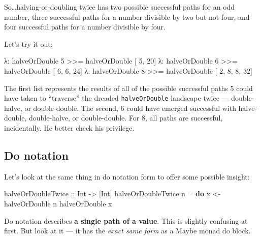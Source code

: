\documentclass[]{article}
\newenvironment{Shaded}{}{}
\newcommand{\KeywordTok}[1]{\textcolor[rgb]{0.00,0.44,0.13}{\textbf{{#1}}}}
\newcommand{\DataTypeTok}[1]{\textcolor[rgb]{0.56,0.13,0.00}{{#1}}}
\newcommand{\DecValTok}[1]{\textcolor[rgb]{0.25,0.63,0.44}{{#1}}}
\newcommand{\OtherTok}[1]{\textcolor[rgb]{0.00,0.44,0.13}{{#1}}}
\newcommand{\FunctionTok}[1]{\textcolor[rgb]{0.02,0.16,0.49}{{#1}}}
\newcommand{\NormalTok}[1]{{#1}}
\begin{document}
So\ldots{}halving-or-doubling twice has two possible successful paths
for an odd number, three successful paths for a number divisible by two
but not four, and four successful paths for a number divisible by four.

Let's try it out:

\begin{Shaded}
\begin{Highlighting}[]
\NormalTok{λ}\FunctionTok{:} \NormalTok{halveOrDouble }\DecValTok{5} \FunctionTok{>>=} \NormalTok{halveOrDouble}
\NormalTok{[       }\DecValTok{5}\NormalTok{, }\DecValTok{20}\NormalTok{]}
\NormalTok{λ}\FunctionTok{:} \NormalTok{halveOrDouble }\DecValTok{6} \FunctionTok{>>=} \NormalTok{halveOrDouble}
\NormalTok{[    }\DecValTok{6}\NormalTok{, }\DecValTok{6}\NormalTok{, }\DecValTok{24}\NormalTok{]}
\NormalTok{λ}\FunctionTok{:} \NormalTok{halveOrDouble }\DecValTok{8} \FunctionTok{>>=} \NormalTok{halveOrDouble}
\NormalTok{[ }\DecValTok{2}\NormalTok{, }\DecValTok{8}\NormalTok{, }\DecValTok{8}\NormalTok{, }\DecValTok{32}\NormalTok{]}
\end{Highlighting}
\end{Shaded}

The first list represents the results of all of the possible successful
paths 5 could have taken to ``traverse'' the dreaded
\texttt{halveOrDouble} landscape twice --- double-halve, or
double-double. The second, 6 could have emerged successful with
halve-double, double-halve, or double-double. For 8, all paths are
successful, incidentally. He better check his privilege.

\subsection{Do notation}\label{do-notation}

Let's look at the same thing in do notation form to offer some possible
insight:

\begin{Shaded}
\begin{Highlighting}[]
\OtherTok{halveOrDoubleTwice ::} \DataTypeTok{Int} \OtherTok{->} \NormalTok{[}\DataTypeTok{Int}\NormalTok{]}
\NormalTok{halveOrDoubleTwice n }\FunctionTok{=} \KeywordTok{do}
    \NormalTok{x }\OtherTok{<-} \NormalTok{halveOrDouble n}
    \NormalTok{halveOrDouble x}
\end{Highlighting}
\end{Shaded}

Do notation describes \textbf{a single path of a value}. This is
slightly confusing at first. But look at it --- it has the \emph{exact
same form} as a Maybe monad do block.
\end{document}
